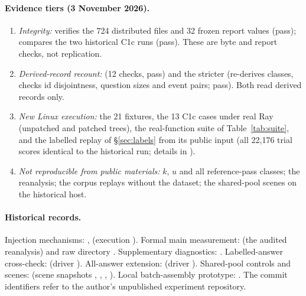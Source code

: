 \documentclass[11pt,a4paper]{article}
\begin{document}
\paragraph{Evidence tiers (3 November 2026).}
\begin{enumerate}
\item \emph{Integrity:}  verifies the 724 distributed files and 32 frozen report values (pass);  compares the two historical C1c runs (pass). These are byte and report checks, not replication.
\item \emph{Derived-record recount:}  (12 checks, pass) and the stricter  (re-derives classes, checks id disjointness, question sizes and event pairs; pass). Both read derived records only.
\item \emph{New Linux execution:} the 21 fixtures, the 13 C1c cases under real Ray (unpatched and patched trees), the real-function suite of Table~\ref{tab:suite}, and the labelled replay of \S\ref{sec:labels} from its public input (all 22,176 trial scores identical to the historical run; details in ).
\item \emph{Not reproducible from public materials:} $k$, $u$ and all reference-pass classes; the reanalysis; the corpus replays without the dataset; the shared-pool scenes on the historical host.
\end{enumerate}

\paragraph{Historical records.} Injection mechanisms: ,  (execution ). Formal main measurement:  (the audited reanalysis) and raw directory . Supplementary diagnostics: . Labelled-answer cross-check:  (driver ). All-answer extension:  (driver ). Shared-pool controls and scenes:  (scene snapshots , , , ). Local batch-assembly prototype: . The commit identifiers refer to the author's unpublished experiment repository.
\end{document}
